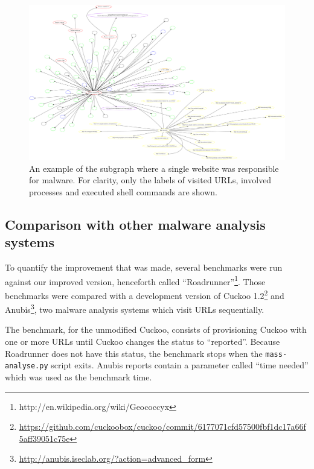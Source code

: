 \pagebreak

\begin{figure}[h]
    \centering
    \includegraphics[width=25cm, angle=90]{Images/report_Subprocess_from_tab}
    \caption{An example of the subgraph where a single website was responsible for malware. For clarity, only the labels of visited URLs, involved processes and executed shell commands are shown.}
    \label{fig:subgraph}
\end{figure}

\pagebreak

\restoregeometry
{}
\setcounter{page}{\thesavepage}

\subsection{Comparison with other malware analysis systems}

To quantify the improvement that was made, several benchmarks were run against our improved version, henceforth called ``Roadrunner''\footnote{http://en.wikipedia.org/wiki/Geococcyx}. Those benchmarks were compared with a development version of Cuckoo 1.2\footnote{\url{https://github.com/cuckoobox/cuckoo/commit/6177071cfd57500fbf1dc17a66f5aff39051c75e}} and Anubis\footnote{\url{http://anubis.iseclab.org/?action=advanced\_form}}, two malware analysis systems which visit URLs sequentially.%

The benchmark, for the unmodified Cuckoo, consists of provisioning Cuckoo with one or more URLs until Cuckoo changes the status to ``reported''. Because Roadrunner does not have this status, the benchmark stops when the \texttt{mass-analyse.py} script exits. Anubis reports contain a parameter called ``time needed'' which was used as the benchmark time.

